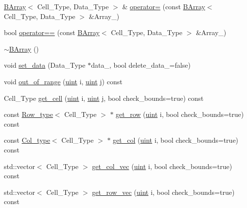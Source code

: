 \begin{DoxyCompactItemize}
\item 
\hyperlink{class_b_array}{B\+Array}$<$ Cell\+\_\+\+Type, Data\+\_\+\+Type $>$ \& \hyperlink{class_b_array_aa6dba52877c92fa8eafc35faa5f7f304}{operator=} (const \hyperlink{class_b_array}{B\+Array}$<$ Cell\+\_\+\+Type, Data\+\_\+\+Type $>$ \&Array\+\_\+)
\item 
bool \hyperlink{class_b_array_a1e6e18162202b06e19f214097eb993bf}{operator==} (const \hyperlink{class_b_array}{B\+Array}$<$ Cell\+\_\+\+Type, Data\+\_\+\+Type $>$ \&Array\+\_\+)
\item 
\hyperlink{class_b_array_af39acdf29aa5999a7f5fd48141be384e}{$\sim$\+B\+Array} ()
\item 
void \hyperlink{class_b_array_accf44b49caa7746a462a3ac9b6024cfc}{set\+\_\+data} (Data\+\_\+\+Type $\ast$data\+\_\+, bool delete\+\_\+data\+\_\+=false)
\item 
void \hyperlink{class_b_array_a87bad4dcad82009d5721d21808b7e469}{out\+\_\+of\+\_\+range} (\hyperlink{typedefs_8hpp_a91ad9478d81a7aaf2593e8d9c3d06a14}{uint} i, \hyperlink{typedefs_8hpp_a91ad9478d81a7aaf2593e8d9c3d06a14}{uint} j) const
\item 
Cell\+\_\+\+Type \hyperlink{class_b_array_a4096e4447f91ba52766587a08c62f1fa}{get\+\_\+cell} (\hyperlink{typedefs_8hpp_a91ad9478d81a7aaf2593e8d9c3d06a14}{uint} i, \hyperlink{typedefs_8hpp_a91ad9478d81a7aaf2593e8d9c3d06a14}{uint} j, bool check\+\_\+bounds=true) const
\item 
const \hyperlink{typedefs_8hpp_a4deca4f3fb25a4da374818ab459b8b4a}{Row\+\_\+type}$<$ Cell\+\_\+\+Type $>$ $\ast$ \hyperlink{class_b_array_a2c969ceb1d37eff9ebcac25741de1808}{get\+\_\+row} (\hyperlink{typedefs_8hpp_a91ad9478d81a7aaf2593e8d9c3d06a14}{uint} i, bool check\+\_\+bounds=true) const
\item 
const \hyperlink{typedefs_8hpp_a3bb95a7612ee928fba42f33a96adb3eb}{Col\+\_\+type}$<$ Cell\+\_\+\+Type $>$ $\ast$ \hyperlink{class_b_array_a90bd31bc0b3fa59d11150cd4ea39b3b6}{get\+\_\+col} (\hyperlink{typedefs_8hpp_a91ad9478d81a7aaf2593e8d9c3d06a14}{uint} i, bool check\+\_\+bounds=true) const
\item 
std\+::vector$<$ Cell\+\_\+\+Type $>$ \hyperlink{class_b_array_aa2d5a133fc4adf3417f1fdc2ef5aae26}{get\+\_\+col\+\_\+vec} (\hyperlink{typedefs_8hpp_a91ad9478d81a7aaf2593e8d9c3d06a14}{uint} i, bool check\+\_\+bounds=true) const
\item 
std\+::vector$<$ Cell\+\_\+\+Type $>$ \hyperlink{class_b_array_a2be45b966d99e2bdd3f9994ed70ff145}{get\+\_\+row\+\_\+vec} (\hyperlink{typedefs_8hpp_a91ad9478d81a7aaf2593e8d9c3d06a14}{uint} i, bool check\+\_\+bounds=true) const

\end{DoxyCompactItemize}
